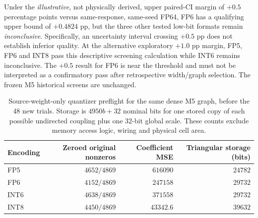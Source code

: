 Under the \emph{illustrative}, not physically
derived, upper paired-CI margin of $+0.5$
percentage points versus same-response,
same-seed FP64, FP6 has a qualifying
upper bound of $+0.4824$ pp, but the
three other tested low-bit formats remain
\emph{inconclusive}. Specifically, an
uncertainty interval crossing $+0.5$ pp
does not establish inferior quality.
At the alternative exploratory $+1.0$
pp margin, FP5, FP6 and INT8 pass this
descriptive screening calculation while
INT6 remains inconclusive.
The $+0.5$ result for FP6 is near the
threshold and must not be interpreted
as a confirmatory pass after
retrospective width/graph selection.
The frozen M5 historical screens are
unchanged.

\begin{table}[htbp]\centering\small
\begin{tabular}{@{}l rrr@{}}\toprule
Encoding & Zeroed original nonzeros & Coefficient MSE
& Triangular storage (bits)\\\midrule
FP5 & $4652/4869$ & $616090$ & $24782$\\
FP6 & $4152/4869$ & $247158$ & $29732$\\
INT6 & $4638/4869$ & $371558$ & $29732$\\
INT8 & $4450/4869$ & $43342.6$ & $39632$\\\bottomrule
\end{tabular}
\caption{Source-weight-only quantizer preflight for
the same dense M5 graph, before the 48 new trials.
Storage is $4950b+32$ nominal bits for one stored
copy of each possible undirected coupling plus
one 32-bit global scale. These counts exclude
memory access logic, wiring and physical cell area.}
\label{tab:ex1-quantization}
\end{table}

